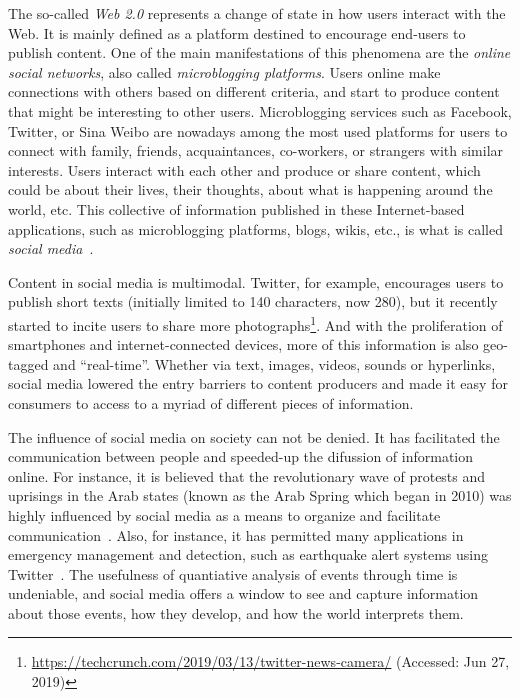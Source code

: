 \documentclass[runningheads]{llncs}
\begin{document}

The so-called {\em Web 2.0} represents a change of state in how users interact
with the Web.
%
It is mainly defined as a platform destined to encourage end-users to
publish content. 
%
One of the main manifestations of this phenomena are the {\em online social
networks}, also called {\em microblogging platforms}.
%
Users online make connections with others based on different criteria, and start
to produce content that might be interesting to other users. 
%
Microblogging services such as Facebook, Twitter, or Sina Weibo are nowadays
among the most used platforms for users to connect with family, friends,
acquaintances, co-workers, or strangers with similar interests.   
%
Users interact with each other and produce or share content, which could be
about their lives, their thoughts, about what is happening around the world,
etc.    
%
This collective of information published in these Internet-based applications,
such as microblogging platforms, blogs, wikis, etc., is what is called {\em
social media}~\cite{kaplan2010users}.



Content in social media is multimodal. 
%
Twitter, for example, encourages users to publish short texts (initially limited
to 140 characters, now 280), but it recently started to incite users to share
more
photographs\footnote{\url{https://techcrunch.com/2019/03/13/twitter-news-camera/}
(Accessed: Jun 27, 2019)}.
%  
And with the proliferation of smartphones and internet-connected devices, more
of this information is also geo-tagged and ``real-time''. 
%
Whether via text, images, videos, sounds or hyperlinks, social media lowered the
entry barriers to content producers and made it easy for consumers to access to
a myriad of different pieces of information.





The influence of social media on society can not be denied. 
% 
It has facilitated the communication between people and speeded-up the difussion
of information online. 
%
For instance, it is believed that the revolutionary wave of protests and
uprisings in the Arab states (known as the Arab Spring which began in 2010) was
highly influenced by social media as a means to organize and facilitate
communication~\cite{howard2011opening}. 
%
Also, for instance, it has permitted many applications in emergency management
and detection, such as earthquake alert systems using
Twitter~\cite{Sakaki2010,Sarmiento:2018:DDE:3201064.3201077,Mendoza2019}.
%
The usefulness of quantiative analysis of events through time is undeniable, and
social media offers a window to see and capture information about those events,
how they develop, and how the world interprets them.
\end{document}
